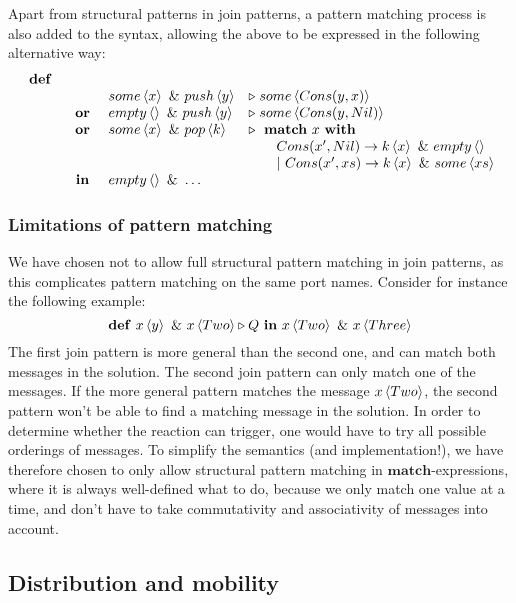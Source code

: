 Apart from structural patterns in join patterns, a pattern matching process is
also added to the syntax, allowing the above to be expressed in the following
alternative way:
\begin{displaymath}
\begin{array}{rcll}
\defJ
\\ & &  \atm some<x> \andJ \atm push<y>&\toJ{} \atm some<Cons(y,x)>
\\ &\orJ&\atm empty<> \andJ \atm push<y> &\toJ{} \atm some<Cons(y,Nil)>
\\ &\orJ&\atm some<x> \andJ \atm pop<k> &\toJ{}  \match x \with
\\ &&& \qquad         Cons(x',Nil) \to \atm k<x> \andJ \atm empty<>
\\ &&& \qquad    |~ Cons(x',xs) \to \atm k<x> \andJ \atm some<xs>
\\&\inJ& \atm empty<> \andJ \ldots
\end{array}
\end{displaymath}

\subsubsection{Limitations of pattern matching}

We have chosen not to allow full structural pattern matching in join patterns,
as this complicates pattern matching on the same port names. Consider for
instance the following example:
\begin{equation*}
 \mathbf{def}~ \atm x<y>~\&~ \atm x<Two> \triangleright Q~
 \mathbf{in}~\atm x<Two>~\&~\atm x<Three>
\end{equation*}
The first join pattern is more general than the second one, and can match both
messages in the solution. The second join pattern can only match one of the
messages. If the more general pattern matches the message $\atm x<Two>$, the
second pattern won't be able to find a matching message in the solution. In
order to determine whether the reaction can trigger, one would have to try all
possible orderings of messages. To simplify the semantics (and implementation!),
we have therefore chosen to only allow structural pattern matching in
$\mathbf{match}$-expressions, where it is always well-defined what to do,
because we only match one value at a time, and don't have to take commutativity
and associativity of messages into account.


\subsection{Distribution and mobility}

